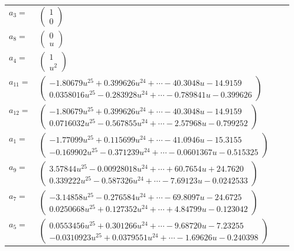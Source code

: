 \documentclass[1p]{elsarticle_modified}
\theoremstyle{definition}
\begin{document}
\begin{tabular}{m{7pt} m{180pt} m{7pt} m{180pt} }
\flushright $a_{3}=$&$\begin{pmatrix}1\\0\end{pmatrix}$ \\
\flushright $a_{8}=$&$\begin{pmatrix}0\\u\end{pmatrix}$ \\
\flushright $a_{4}=$&$\begin{pmatrix}1\\u^2\end{pmatrix}$ \\
\flushright $a_{11}=$&$\begin{pmatrix}-1.80679 u^{25}+0.399626 u^{24}+\cdots-40.3048 u-14.9159\\0.0358016 u^{25}-0.283928 u^{24}+\cdots-0.789841 u-0.399626\end{pmatrix}$ \\
\flushright $a_{12}=$&$\begin{pmatrix}-1.80679 u^{25}+0.399626 u^{24}+\cdots-40.3048 u-14.9159\\0.0716032 u^{25}-0.567855 u^{24}+\cdots-2.57968 u-0.799252\end{pmatrix}$ \\
\flushright $a_{1}=$&$\begin{pmatrix}-1.77099 u^{25}+0.115699 u^{24}+\cdots-41.0946 u-15.3155\\-0.169902 u^{25}-0.371239 u^{24}+\cdots-0.0601367 u-0.515325\end{pmatrix}$ \\
\flushright $a_{9}=$&$\begin{pmatrix}3.57844 u^{25}-0.00928018 u^{24}+\cdots+60.7654 u+24.7620\\0.339222 u^{25}-0.587326 u^{24}+\cdots-7.69123 u-0.0242533\end{pmatrix}$ \\
\flushright $a_{7}=$&$\begin{pmatrix}-3.14858 u^{25}-0.276584 u^{24}+\cdots-69.8097 u-24.6725\\0.0250668 u^{25}+0.127352 u^{24}+\cdots+4.84799 u-0.123042\end{pmatrix}$ \\
\flushright $a_{5}=$&$\begin{pmatrix}0.0553456 u^{25}+0.301266 u^{24}+\cdots-9.68720 u-7.23255\\-0.0310923 u^{25}+0.0379551 u^{24}+\cdots-1.69626 u-0.240398\end{pmatrix}$ \\

\end{tabular}
\end{document}
